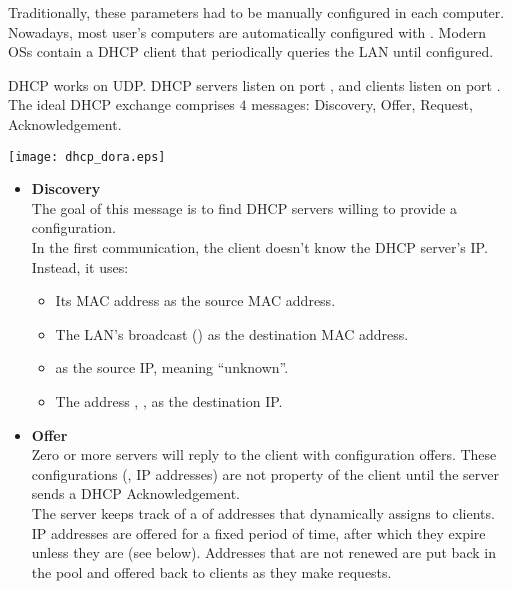 Traditionally, these parameters had to be manually configured in each computer.
Nowadays, most user's computers are automatically configured with .
Modern OSs contain a DHCP client that periodically queries the LAN until configured.

DHCP works on UDP. DHCP servers listen on port , and clients 
listen on port . The ideal DHCP exchange comprises $4$ messages:
Discovery, Offer, Request, Acknowledgement.

\begin{center}
\texttt{[image: dhcp\_dora.eps]}
\end{center}


\begin{itemize}

\item \textbf{Discovery}\\
The goal of this message is to find DHCP servers willing to provide 
a configuration.\\[-0.3cm]

In the first communication, the client 
doesn't know the DHCP server's IP. Instead, it uses:
\begin{itemize}
\item Its MAC address as the source MAC address.
\item The LAN's broadcast () as the destination MAC address.
\item {} as the source IP, meaning ``unknown''.
\item The  address , , as the destination IP.
\end{itemize}

\vspace{0.25cm}
\item \textbf{Offer}\\
Zero or more servers will reply to the client with configuration offers.
These configurations (\eg, IP addresses) are not property of the client 
until the server sends a DHCP Acknowledgement.\\[-0.3cm]

The server keeps track of a  of addresses that dynamically 
assigns to clients.
% 
IP addresses are offered for a fixed period of time, after which they expire
unless they are  (see below). Addresses that are not renewed are put 
back in the pool and offered back to clients as they make requests.
\\[-0.3cm]


\end{itemize}
